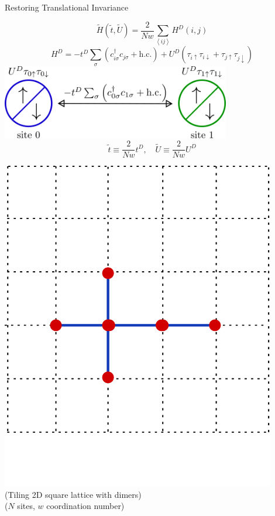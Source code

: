 \documentclass[aspectratio=169]{beamer}
\begin{document}
\begin{frame}{Restoring Translational Invariance}
\begin{minipage}{0.55\textwidth}
	\centering
	\[\tilde H(\tilde t, \tilde U) = \frac{2}{Nw}\sum_{\left<ij \right>}H^D(i,j)\]
	\[H^D = -{t}^D\sum_{\sigma}\left(c^\dagger_{i\sigma}c_{j\sigma} + \text{h.c.}\right) + U^D\left(\tau_{i \uparrow} \tau_{i \downarrow} + \tau_{j \uparrow} \tau_{j \downarrow}\right)\]
	\includegraphics[width=0.75\textwidth]{./hubb_dim.png}
	\[\tilde t \equiv \frac{2}{Nw}t^D, \quad\tilde U \equiv \frac{2}{Nw}U^D\]
\end{minipage}
\hspace*{\fill}
\begin{minipage}{0.4\textwidth}
	\centering
	\includegraphics[width=0.9\textwidth]{./tiling.png}\\
	\vspace*{-20pt}
	{\small (Tiling 2D square lattice with dimers)}\\
	{\small ($N$ sites, $w$ coordination number)}
\end{minipage}
\end{frame}
\end{document}
